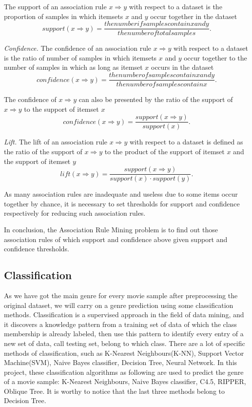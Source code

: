 \documentclass[conference]{IEEEtran}
\begin{document}
The support of an association rule $x\Rightarrow y$ with respect to a dataset is the proportion of samples in which itemsets $x$ and $y$ occur together in the dataset
\begin{equation*}
support(x\Rightarrow y) = \frac{the number if samples contain x and y}{the number of total samples}.
\end{equation*}


\textit{Confidence.} The confidence of an association rule $x\Rightarrow y$ with respect to a dataset is the ratio of number of samples in which itemsets $x$ and $y$ occur together to the number of samples in which as long as itemset $x$ occurs in the dataset 
\begin{equation*}
confidence(x\Rightarrow y) = \frac{the number of samples contain x and y}{the number of samples contain x}.
\end{equation*}

The confidence of $x\Rightarrow y$ can also be presented by the ratio of the support of $x\Rightarrow y$ to the support of itemset $x$
\begin{equation*}
confidence(x\Rightarrow y) = \frac{support(x\Rightarrow y)}{support(x)}.
\end{equation*}


\textit{Lift.} The lift of an association rule $x\Rightarrow y$ with respect to a dataset is defined as the ratio of  the support of $x\Rightarrow y$ to the product of the support of itemset $x$ and the support of 
itemset $y$
\begin{equation*}
lift(x\Rightarrow y) = \frac{support(x\Rightarrow y)}{support(x)\cdot support(y)}.
\end{equation*}


As many association rules are inadequate and useless due to some items occur together by 
chance, it is necessary to set thresholds for support and confidence respectively for reducing such association rules. 

In conclusion, the Association Rule Mining problem is to find out those association rules of which support and confidence above given support and confidence thresholds. 

\subsection{Classification}
As we have got the main genre for every movie sample after preprocessing the original dataset, we will carry on a genre prediction using some classification methods. Classification is a supervised approach in the field of data mining, and it discovers a knowledge pattern from a training set of data of which the class membership is already labeled, then use this pattern to identify every entry of a new set of data, call testing set, belong to which class. There are a lot of specific methods of classification, such as K-Nearest Neighbours(K-NN), Support Vector Machine(SVM), Naive Bayes classifier, Decision Tree, Neural Network.
In this project, these classification algorithms as following are used to predict the genre of a movie sample:  K-Nearest Neighbours, Naive Bayes classifier, C4.5, RIPPER, Oblique Tree. It is worthy to notice that the last three methods belong to Decision Tree. 
\end{document}
